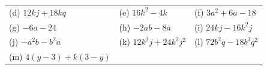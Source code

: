\begin{enumerate}[noitemsep, label=\textbf{\arabic*}. ]
{{\begin{center}
\begin{tabular}[t]{|l|l|l|}
        (d) $12kj+18kq$ &
        (e) $16{k}^{2}-4k$ &
        (f) $3{a}^{2}+6a-18$%
     \tabularnewline\cline{1-1}\cline{2-2}\cline{3-3}
        (g) $-6a-24$ &
        (h) $-2ab-8a$ &
        (i) $24kj-16{k}^{2}j$%
     \tabularnewline\cline{1-1}\cline{2-2}\cline{3-3}
        (j) $-{a}^{2}b-{b}^{2}a$ &
        (k) $12{k}^{2}j+24{k}^{2}{j}^{2}$ &
        (l) $72{b}^{2}q-18{b}^{3}{q}^{2}$%
     \tabularnewline\cline{1-1}\cline{2-2}\cline{3-3}
        (m) $4\left(y-3\right)+k\left(3-y\right)$ &

\end{tabular}
\end{center}}}
\end{enumerate}

